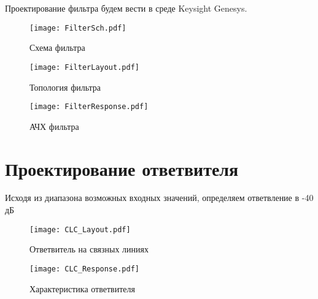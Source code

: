 Проектирование фильтра будем вести в среде Keysight Genesys.

\begin{figure}[H]
		\centering
		\texttt{[image: FilterSch.pdf]}
		\caption{Схема фильтра}%
		\label{fig:FilterSch}
\end{figure}

\begin{figure}[H]
	\centering
	\texttt{[image: FilterLayout.pdf]}
	\caption{Топология фильтра}%
	\label{fig:FilterLayout}
\end{figure}

\begin{figure}[H]
	\centering
	\texttt{[image: FilterResponse.pdf]}
	\caption{АЧХ фильтра}%
	\label{fig:FilterResponse}
\end{figure}
	
\section{Проектирование ответвителя}

Исходя из диапазона возможных входных значений, определяем ответвление в -40 дБ

\begin{figure}[H]
	\centering
	\texttt{[image: CLC\_Layout.pdf]}
	\caption{Ответвитель на связных линиях}%
	\label{fig:CLC_Layout}
\end{figure}

\begin{figure}[H]
	\centering
	\texttt{[image: CLC\_Response.pdf]}
	\caption{Характеристика ответвителя}%
	\label{fig:CLC_Response}
\end{figure}